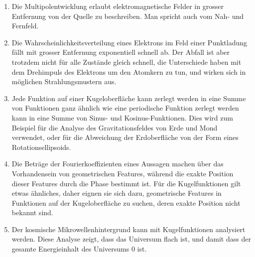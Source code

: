 \begin{enumerate}
\item
Die Multipolentwicklung erlaubt elektromagnetische Felder in grosser
Entfernung von der Quelle zu beschreiben.
Man spricht auch vom Nah- und Fernfeld.
\item
Die Wahrscheinlichkeitsverteilung eines Elektrons im Feld einer Punktladung
fällt mit grosser Entfernung exponentiell schnell ab.
Der Abfall ist aber trotzdem nicht für alle Zustände gleich schnell,
die Unterschiede haben mit dem Drehimpuls des Elektrons um den Atomkern
zu tun, und wirken sich in möglichen Strahlungsmustern aus.
\item
Jede Funktion auf einer Kugeloberfläche kann zerlegt werden in eine
Summe von Funktionen ganz ähnlich wie eine periodische Funktion
zerlegt werden kann in eine Summe von Sinus- und Kosinus-Funktionen.
Dies wird zum Beispiel für die Analyse des Gravitationsfeldes von
Erde und Mond verwendet, oder für die Abweichung der Erdoberfläche
von der Form eines Rotationsellipsoids.
\item 
Die Beträge der Fourierkoeffizienten eines Aussagen machen
über das Vorhandensein von geometrischen Features, während die exakte
Position dieser Features durch die Phase bestimmt ist.
Für die Kugelfunktionen gilt etwas ähnliches, daher eignen sie
sich dazu, geometrische Features in Funktionen auf der Kugeloberfläche
zu suchen, deren exakte Position nicht bekannt sind.
\item
Der kosmische Mikrowellenhintergrund kann mit Kugelfunktionen analysiert
werden.
Diese Analyse zeigt, dass das Universum flach ist, und damit dass der
gesamte Energieinhalt des Universums $0$ ist.
\end{enumerate}









